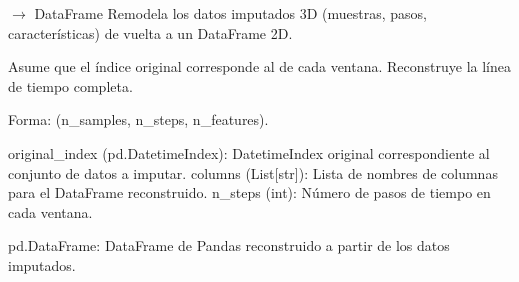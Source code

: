 \documentclass[letterpaper,10pt,english]{sphinxmanual}
\begin{document}
\begin{fulllineitems}
\label{\detokenize{pampaneira_imputation:pampaneira_imputation.utils.reshape_imputed_to_df}}
\pysigstartsignatures
\pysiglinewithargsret
{}
{\sphinxparamcomma {}\sphinxparamcomma {}\sphinxparamcomma {}}
{{ $\rightarrow$ DataFrame}}
\pysigstopsignatures
\sphinxAtStartPar
Remodela los datos imputados 3D (muestras, pasos, características) de vuelta a un DataFrame 2D.

\sphinxAtStartPar
Asume que el índice original corresponde al  de cada ventana.
Reconstruye la línea de tiempo completa.
\begin{description}
\begin{description}
\sphinxAtStartPar
Forma: (n\_samples, n\_steps, n\_features).

\end{description}

\sphinxAtStartPar
original\_index (pd.DatetimeIndex): DatetimeIndex original correspondiente al conjunto de datos a imputar.
columns (List{[}str{]}): Lista de nombres de columnas para el DataFrame reconstruido.
n\_steps (int): Número de pasos de tiempo en cada ventana.

\sphinxAtStartPar
pd.DataFrame: DataFrame de Pandas reconstruido a partir de los datos imputados.

\end{description}

\end{fulllineitems}

\end{document}
